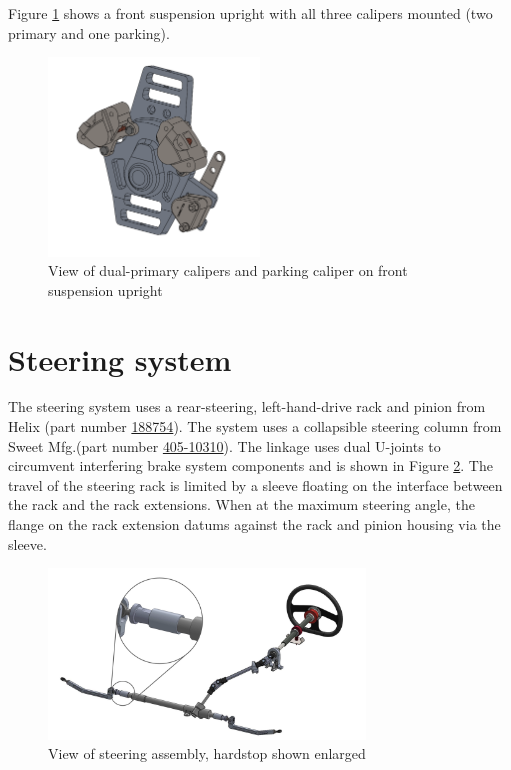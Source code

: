 \documentclass[10pt]{article}
\begin{document}
Figure \ref{fig:calipers-mounting-geometry} shows a front suspension upright with all three calipers mounted (two primary and one parking).

\begin{figure}
\centering
\includegraphics[width=0.5\textwidth]{figures/caliper-mounting-geometry}
\caption{View of dual-primary calipers and parking caliper on front suspension upright }
\label{fig:calipers-mounting-geometry}
\end{figure}

\section{Steering system}
The steering system uses a rear-steering, left-hand-drive rack and pinion from Helix (part number \href{http://www.helixsuspension.com/catalog/Steering/Manual-Steering-Racks/HEXSR5/Omni-Manual-Steering-Rack---Rear-Steering}{188754}). The system uses a collapsible steering column from Sweet Mfg.\@ (part number \href{https://sweetmfg.biz/product.php?productid=2836}{405-10310}). The linkage uses dual U-joints to circumvent interfering brake system components and is shown in Figure \ref{fig:steering-assembly}. The travel of the steering rack is limited by a sleeve floating on the interface between the rack and the rack extensions. When at the maximum steering angle, the flange on the rack extension datums against the rack and pinion housing via the sleeve.

\begin{figure}
\centering
\includegraphics[width=0.75\textwidth]{figures/steering-assembly}
\caption{View of steering assembly, hardstop shown enlarged}
\label{fig:steering-assembly}
\end{figure}
\end{document}
